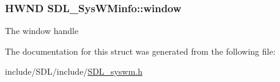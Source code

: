 \hypertarget{struct_s_d_l___sys_w_minfo_af06225591ff07e837bbd037728a525b9}{
\subsubsection[{window}]{\setlength{\rightskip}{0pt plus 5cm}H\-W\-N\-D S\-D\-L\-\_\-\-Sys\-W\-Minfo\-::window}}\label{struct_s_d_l___sys_w_minfo_af06225591ff07e837bbd037728a525b9}
The window handle 

The documentation for this struct was generated from the following file\-:\begin{DoxyCompactItemize}
\item 
include/\-S\-D\-L/include/\hyperlink{_s_d_l__syswm_8h}{S\-D\-L\-\_\-syswm.\-h}\end{DoxyCompactItemize}
